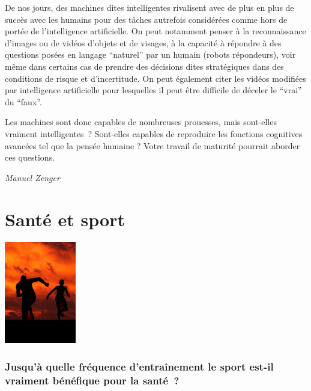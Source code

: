\documentclass[
  10pt,
  french,
  a5paper,
  openany]{book}
\newenvironment{signature}{\begin{flushright}}{\end{flushright}}
\begin{document}
De nos jours, des machines dites intelligentes rivalisent avec de plus en plus de succès avec les humains pour des tâches autrefois considérées comme hors de portée de l'intelligence artificielle. On peut notamment penser à la reconnaissance d'images ou de vidéos d'objets et de visages, à la capacité à répondre à des questions posées en langage ``naturel'' par un humain (robots répondeurs), voir même dans certains cas de prendre des décisions dites stratégiques dans des conditions de risque et d'incertitude. On peut également citer les vidéos modifiées par intelligence artificielle pour lesquelles il peut être difficile de déceler le ``vrai'' du ``faux''.

Les machines sont donc capables de nombreuses prouesses, mais sont-elles vraiment intelligentes~? Sont-elles capables de reproduire les fonctions cognitives avancées tel que la pensée humaine ? Votre travail de maturité pourrait aborder ces questions.

\begin{signature}
\emph{Manuel Zenger}

\end{signature}

\hypertarget{santuxe9-et-sport}{%
\chapter{Santé et sport}\label{santuxe9-et-sport}}

\begin{center}
\includegraphics[width=\textwidth,height=12em]{images/sante-sport.jpg}

\end{center}

\hypertarget{jusquuxe0-quelle-fruxe9quence-dentrauxeenement-le-sport-est-il-vraiment-buxe9nuxe9fique-pour-la-santuxe9}{%
\subsection*{Jusqu'à quelle fréquence d'entraînement le sport est-il vraiment bénéfique pour la santé~?}\label{jusquuxe0-quelle-fruxe9quence-dentrauxeenement-le-sport-est-il-vraiment-buxe9nuxe9fique-pour-la-santuxe9}}
\end{document}
